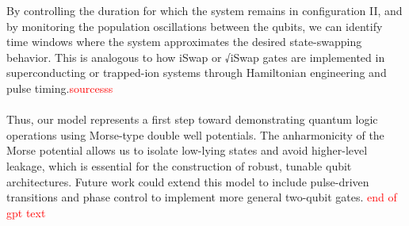 \documentclass{subfiles}
\begin{document}
By controlling the duration for which the system remains in configuration II, and by monitoring the population oscillations between the qubits, we can identify time windows where the system approximates the desired state-swapping behavior. This is analogous to how iSwap or √iSwap gates are implemented in superconducting or trapped-ion systems through Hamiltonian engineering and pulse timing.\textcolor{red}{sourcesss} \\ \\

Thus, our model represents a first step toward demonstrating quantum logic operations using Morse-type double well potentials. The anharmonicity of the Morse potential allows us to isolate low-lying states and avoid higher-level leakage, which is essential for the construction of robust, tunable qubit architectures. Future work could extend this model to include pulse-driven transitions and phase control to implement more general two-qubit gates.
\textcolor{red}{end of gpt text}
\end{document}
